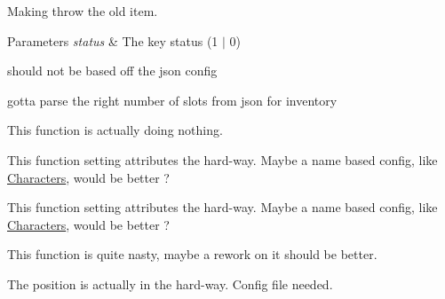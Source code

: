 
\begin{DoxyRefList}
\item[\label{todo__todo000002}%
\hypertarget{todo__todo000002}{}%
Member \hyperlink{class_characters_aee824830a67177342ae606f959fb0c7a}{Characters\+:\+:\+\_\+pickup\+Item} (int status)]Making throw the old item. 
\begin{DoxyParams}{Parameters}
{\em status} & The key status (1 $\vert$ 0)  \\
\hline
\end{DoxyParams}

\item[\label{todo__todo000003}%
\hypertarget{todo__todo000003}{}%
Member \hyperlink{class_characters_a4720d3fc5500d8961a7c31bd5ff8bd46}{Characters\+:\+:\+\_\+special\+Move} (void)]should not be based off the json config  
\item[\label{todo__todo000001}%
\hypertarget{todo__todo000001}{}%
Member \hyperlink{class_characters_a3ebbe5ca8cc3965b55283af002ce8707}{Characters\+:\+:Characters} (std\+::string name)]gotta parse the right number of slots from json for inventory  
\item[\label{todo__todo000006}%
\hypertarget{todo__todo000006}{}%
Member \hyperlink{class_consumable_adb866e69c3796edffad832b88e527518}{Consumable\+:\+:Begin\+Contact} (\hyperlink{class_elements}{Elements} $\ast$elem, b2\+Contact $\ast$contact)]This function is actually doing nothing.  
\item[\label{todo__todo000004}%
\hypertarget{todo__todo000004}{}%
Member \hyperlink{class_consumable_ae374944f6333618dd08318b98b6950c7}{Consumable\+:\+:Consumable} ()]This function setting attributes the hard-\/way. Maybe a name based config, like \hyperlink{class_characters}{Characters}, would be better ?  
\item[\label{todo__todo000005}%
\hypertarget{todo__todo000005}{}%
Member \hyperlink{class_consumable_adeca9f0d06a24fb2b76ddaa1396d1ddc}{Consumable\+:\+:Consumable} (\hyperlink{class_characters}{Characters} $\ast$c)]This function setting attributes the hard-\/way. Maybe a name based config, like \hyperlink{class_characters}{Characters}, would be better ?  
\item[\label{todo__todo000007}%
\hypertarget{todo__todo000007}{}%
Member \hyperlink{class_elements_adeca7401d8bc32fa75e2c2a0b2627412}{Elements\+:\+:display} (void)]This function is quite nasty, maybe a rework on it should be better.  
\item[\label{todo__todo000008}%
\hypertarget{todo__todo000008}{}%
Member \hyperlink{class_equipment_a2bd67c4254f2074f4f7469f29a20e760}{Equipment\+:\+:Equipment} ()]The position is actually in the hard-\/way. Config file needed.  

\end{DoxyRefList}

